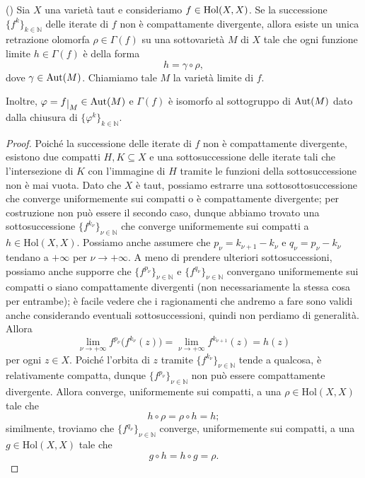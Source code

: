 \begin{thm} \label{retraiii}
    (\cite[Theorem 2.1.5]{A4}) Sia $X$ una varietà taut e consideriamo $f\in\textnormal{Hol}(X,X)$. Se la successione $\{f^k\}_{k\in\mathbb{N}}$ delle iterate di $f$ non è compattamente divergente, allora esiste un unica retrazione olomorfa $\rho\in\Gamma(f)$ su una sottovarietà $M$ di $X$ tale che ogni funzione limite $h\in\Gamma(f)$ è della forma
    $$h=\gamma\circ\rho,$$
    dove $\gamma\in\textnormal{Aut}(M)$. Chiamiamo tale $M$ la \textnormal{varietà limite} di $f$.

    Inoltre, $\varphi=f\restrict{M}\in\textnormal{Aut}(M)$ e $\Gamma(f)$ è isomorfo al sottogruppo di $\textnormal{Aut}(M)$ dato dalla chiusura di $\{\varphi^k\}_{k \in\mathbb{N}}$.
\end{thm}

\begin{proof}
    Poiché la successione delle iterate di $f$ non è compattamente divergente, esistono due compatti $H,K\subseteq X$ e una sottosuccessione delle iterate tali che l'intersezione di $K$ con l'immagine di $H$ tramite le funzioni della sottosuccessione non è mai vuota. Dato che $X$ è taut, possiamo estrarre una sottosottosuccessione che converge uniformemente sui compatti o è compattamente divergente; per costruzione non può essere il secondo caso, dunque abbiamo trovato una sottosuccessione $\{f^{k_{\nu}}\}_{\nu\in\mathbb{N}}$ che converge uniformemente sui compatti a $h\in\text{Hol}(X,X)$. Possiamo anche assumere che $p_\nu=k_{\nu+1}-k_\nu$ e $q_\nu=p_\nu-k_\nu$ tendano a $+\infty$ per $\nu\longrightarrow+\infty$. A meno di prendere ulteriori sottosuccessioni, possiamo anche supporre che $\{f^{p_\nu}\}_{\nu\in\mathbb{N}}$ e $\{f^{q_\nu}\}_{\nu\in\mathbb{N}}$ convergano uniformemente sui compatti o siano compattamente divergenti (non necessariamente la stessa cosa per entrambe); è facile vedere che i ragionamenti che andremo a fare sono validi anche considerando eventuali sottosuccessioni, quindi non perdiamo di generalità. Allora
    $$\lim_{\nu\longrightarrow+\infty}f^{p_\nu}\big(f^{k_\nu}(z)\big)=\lim_{\nu\longrightarrow+\infty}f^{k_{\nu+1}}(z)=h(z)$$
    per ogni $z \in X$. Poiché l'orbita di $z$ tramite $\{f^{k_\nu}\}_{\nu\in\mathbb{N}}$ tende a qualcosa, è relativamente compatta, dunque $\{f^{p_\nu}\}_{\nu\in\mathbb{N}}$ non può essere compattamente divergente. Allora converge, uniformemente sui compatti, a una $\rho\in\text{Hol}(X,X)$ tale che
    \begin{equation} \label{roacca}
        h\circ\rho=\rho\circ h=h;
    \end{equation}
    similmente, troviamo che $\{f^{q_\nu}\}_{\nu\in\mathbb{N}}$ converge, uniformemente sui compatti, a una $g\in\text{Hol}(X,X)$ tale che
    \begin{equation} \label{giacca}
        g\circ h=h\circ g=\rho.
    \end{equation}


\end{proof}
